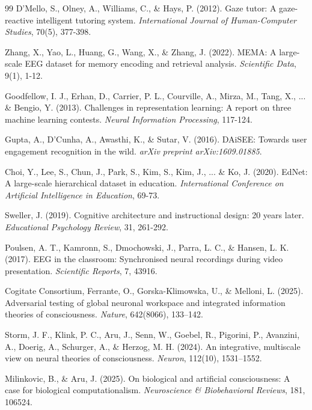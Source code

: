 \documentclass[10pt,journal,compsoc]{IEEEtran}
\begin{document}
\begin{thebibliography}{99}
D'Mello, S., Olney, A., Williams, C., \& Hays, P. (2012). Gaze tutor: A gaze-reactive intelligent tutoring system. \textit{International Journal of Human-Computer Studies}, 70(5), 377-398.

Zhang, X., Yao, L., Huang, G., Wang, X., \& Zhang, J. (2022). MEMA: A large-scale EEG dataset for memory encoding and retrieval analysis. \textit{Scientific Data}, 9(1), 1-12.

Goodfellow, I. J., Erhan, D., Carrier, P. L., Courville, A., Mirza, M., Tang, X., ... \& Bengio, Y. (2013). Challenges in representation learning: A report on three machine learning contests. \textit{Neural Information Processing}, 117-124.

Gupta, A., D'Cunha, A., Awasthi, K., \& Sutar, V. (2016). DAiSEE: Towards user engagement recognition in the wild. \textit{arXiv preprint arXiv:1609.01885}.

Choi, Y., Lee, S., Chun, J., Park, S., Kim, S., Kim, J., ... \& Ko, J. (2020). EdNet: A large-scale hierarchical dataset in education. \textit{International Conference on Artificial Intelligence in Education}, 69-73.

Sweller, J. (2019). Cognitive architecture and instructional design: 20 years later. \textit{Educational Psychology Review}, 31, 261-292.

Poulsen, A. T., Kamronn, S., Dmochowski, J., Parra, L. C., \& Hansen, L. K. (2017). EEG in the classroom: Synchronised neural recordings during video presentation. \textit{Scientific Reports}, 7, 43916.

Cogitate Consortium, Ferrante, O., Gorska-Klimowska, U., \& Melloni, L. (2025). Adversarial testing of global neuronal workspace and integrated information theories of consciousness. \textit{Nature}, 642(8066), 133--142.

Storm, J. F., Klink, P. C., Aru, J., Senn, W., Goebel, R., Pigorini, P., Avanzini, A., Doerig, A., Schurger, A., \& Herzog, M. H. (2024). An integrative, multiscale view on neural theories of consciousness. \textit{Neuron}, 112(10), 1531--1552.

Milinkovic, B., \& Aru, J. (2025). On biological and artificial consciousness: A case for biological computationalism. \textit{Neuroscience \& Biobehavioral Reviews}, 181, 106524.


\end{thebibliography}
\end{document}
